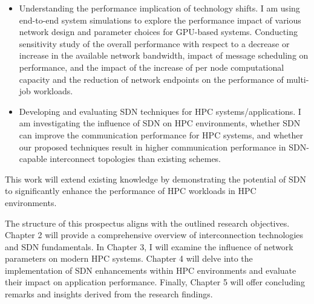 \begin{itemize} 
\item Understanding the performance implication of technology shifts.
I am using end-to-end system simulations to explore the
performance impact of various network design and parameter choices for
GPU-based systems. Conducting sensitivity study of the overall performance with respect to
a decrease or increase in the available network bandwidth, impact of message
scheduling on performance, and the impact of the increase of per node
computational capacity and the reduction of network endpoints on the performance
of multi-job workloads.  
\item Developing and evaluating SDN techniques for HPC systems/applications.
I am investigating the influence of SDN on HPC
environments, whether SDN can improve the communication performance for HPC
systems, and whether our proposed techniques result in higher communication
performance in SDN- capable interconnect topologies than existing schemes.
\end{itemize} 

\begin{comment}
\begin{itemize} 
\item \textcolor{red}{Understanding the performance implication of technology shifts}, using end-to-end system simulations to explore the
performance impact of various hardware design and parameter choices for
GPU-based systems. Conducting sensitivity study of the overall performance with respect to
a decrease or increase in the available network bandwidth, impact of message
scheduling on performance, and the impact of the increase of per node
computational capacity and the reduction of network endpoints on the performance
of multi-job workloads.  
\item \textcolor{red}{Investigating the influence of SDN on HPC
environments}, whether SDN can improve the communication performance for HPC
systems, and whether our proposed techniques result in higher communication
performance in SDN- capable interconnect topologies than existing schemes.
\end{itemize} 
\end{comment}
This work will extend existing knowledge by demonstrating the
potential of SDN to significantly enhance the performance of HPC workloads in
HPC environments.


The structure of this prospectus aligns with the outlined research objectives.
Chapter 2 will provide a comprehensive overview of interconnection technologies
and SDN fundamentals. In Chapter 3, I will examine the
influence of network parameters on modern HPC systems. Chapter 4 will delve into
the implementation of SDN enhancements within HPC environments and evaluate
their impact on application performance. Finally, Chapter 5 will offer
concluding remarks and insights derived from the research findings.

